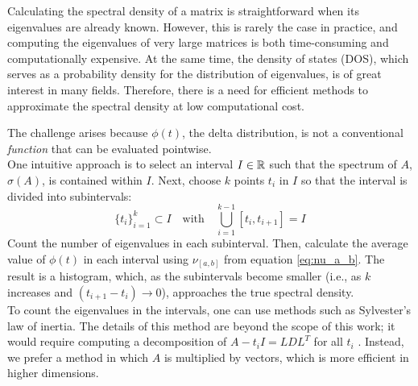 Calculating the spectral density of a matrix is straightforward when its eigenvalues are already known.
However, this is rarely the case in practice, and computing the eigenvalues of very large matrices is both time-consuming and computationally expensive.
At the same time, the density of states (DOS), which serves as a probability density for the distribution of eigenvalues, is of great interest in many fields.
Therefore, there is a need for efficient methods to approximate the spectral density at low computational cost.

The challenge arises because $\phi(t)$, the delta distribution, is not a conventional \emph{function} that can be evaluated pointwise.\\
One intuitive approach is to select an interval $I \in \mathbb{R}$ such that the spectrum of $A$, $\sigma(A)$, is contained within $I$.
Next, choose $k$ points $t_i$ in $I$ so that the interval is divided into subintervals:
$$\{t_i\}_{i = 1}^k \subset I \quad \text{with} \quad \bigcup_{i = 1}^{k - 1} [t_i, t_{i+1}] = I$$
Count the number of eigenvalues in each subinterval.
Then, calculate the average value of $\phi(t)$ in each interval using $\nu_{[a, b]}$ from equation \ref{eq:nu_a_b}.
The result is a histogram, which, as the subintervals become smaller (i.e., as $k$ increases and $(t_{i+1} - t_i) \longrightarrow 0$), approaches the true spectral density.\\
To count the eigenvalues in the intervals, one can use methods such as Sylvester's law of inertia.
The details of this method are beyond the scope of this work;
it would require computing a decomposition of $A - t_i I = LDL^T$ for all $t_i$ \cite{golubvanloan}.
Instead, we prefer a method in which $A$ is multiplied by vectors, which is more efficient in higher dimensions.\\